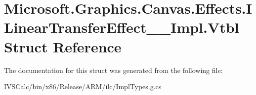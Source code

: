 \hypertarget{struct_microsoft_1_1_graphics_1_1_canvas_1_1_effects_1_1_i_linear_transfer_effect_____impl_1_1_vtbl}{}\section{Microsoft.\+Graphics.\+Canvas.\+Effects.\+I\+Linear\+Transfer\+Effect\+\_\+\+\_\+\+Impl.\+Vtbl Struct Reference}
\label{struct_microsoft_1_1_graphics_1_1_canvas_1_1_effects_1_1_i_linear_transfer_effect_____impl_1_1_vtbl}


The documentation for this struct was generated from the following file\+:\begin{DoxyCompactItemize}
\item 
I\+V\+S\+Calc/bin/x86/\+Release/\+A\+R\+M/ilc/Impl\+Types.\+g.\+cs\end{DoxyCompactItemize}
